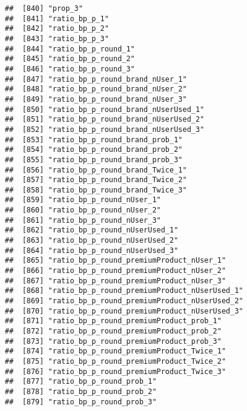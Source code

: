 \documentclass[10pt]{report}
\begin{document}
\begin{verbatim}
##  [840] "prop_3"                                               
##  [841] "ratio_bp_p_1"                                         
##  [842] "ratio_bp_p_2"                                         
##  [843] "ratio_bp_p_3"                                         
##  [844] "ratio_bp_p_round_1"                                   
##  [845] "ratio_bp_p_round_2"                                   
##  [846] "ratio_bp_p_round_3"                                   
##  [847] "ratio_bp_p_round_brand_nUser_1"                       
##  [848] "ratio_bp_p_round_brand_nUser_2"                       
##  [849] "ratio_bp_p_round_brand_nUser_3"                       
##  [850] "ratio_bp_p_round_brand_nUserUsed_1"                   
##  [851] "ratio_bp_p_round_brand_nUserUsed_2"                   
##  [852] "ratio_bp_p_round_brand_nUserUsed_3"                   
##  [853] "ratio_bp_p_round_brand_prob_1"                        
##  [854] "ratio_bp_p_round_brand_prob_2"                        
##  [855] "ratio_bp_p_round_brand_prob_3"                        
##  [856] "ratio_bp_p_round_brand_Twice_1"                       
##  [857] "ratio_bp_p_round_brand_Twice_2"                       
##  [858] "ratio_bp_p_round_brand_Twice_3"                       
##  [859] "ratio_bp_p_round_nUser_1"                             
##  [860] "ratio_bp_p_round_nUser_2"                             
##  [861] "ratio_bp_p_round_nUser_3"                             
##  [862] "ratio_bp_p_round_nUserUsed_1"                         
##  [863] "ratio_bp_p_round_nUserUsed_2"                         
##  [864] "ratio_bp_p_round_nUserUsed_3"                         
##  [865] "ratio_bp_p_round_premiumProduct_nUser_1"              
##  [866] "ratio_bp_p_round_premiumProduct_nUser_2"              
##  [867] "ratio_bp_p_round_premiumProduct_nUser_3"              
##  [868] "ratio_bp_p_round_premiumProduct_nUserUsed_1"          
##  [869] "ratio_bp_p_round_premiumProduct_nUserUsed_2"          
##  [870] "ratio_bp_p_round_premiumProduct_nUserUsed_3"          
##  [871] "ratio_bp_p_round_premiumProduct_prob_1"               
##  [872] "ratio_bp_p_round_premiumProduct_prob_2"               
##  [873] "ratio_bp_p_round_premiumProduct_prob_3"               
##  [874] "ratio_bp_p_round_premiumProduct_Twice_1"              
##  [875] "ratio_bp_p_round_premiumProduct_Twice_2"              
##  [876] "ratio_bp_p_round_premiumProduct_Twice_3"              
##  [877] "ratio_bp_p_round_prob_1"                              
##  [878] "ratio_bp_p_round_prob_2"                              
##  [879] "ratio_bp_p_round_prob_3"                              

\end{verbatim}
\end{document}
